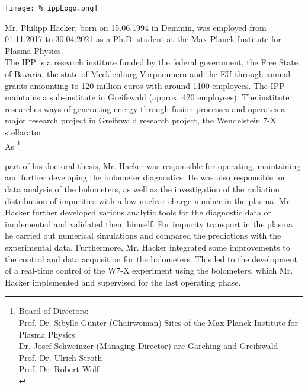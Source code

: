 \documentclass[
  fontsize=11pt,
  paper=a4,
  parskip=half,
  enlargefirstpage=on,    %
  fromalign=right,        %
  fromphone=on,           %
  fromemail=on,            
  fromrule=off,           %
  addrfield=off,          %
  backaddress=off,        %
  subject=beforeopening,  %
  locfield=narrow,        %
  foldmarks=off,          %
]{scrlttr2}
\newcommand\blankFootnote[1]{%
  \begingroup
  \renewcommand\thefootnote{}\footnote{#1}%
  \addtocounter{footnote}{-1}%
  \endgroup
}
\def\light#1{{\color{light}#1}}
\begin{document}
\begin{letter}{}

  \hspace*{9.2cm}%
  \texttt{[image: \%
    ippLogo.png]}\\%

  \opening{}

  Mr. Philipp Hacker, born on 15.06.1994 in Demmin, was employed from 01.11.2017 to 30.04.2021 as a Ph.D. student at the Max Planck Institute for Plasma Physics.\\[0.4cm]%

  The IPP is a research institute funded by the federal government, the Free State of Bavaria, the state of Mecklenburg-Vorpommern and the EU through annual grants amounting to 120 million euros with around 1100 employees. The IPP maintains a sub-institute in Greifswald (approx. 420 employees). The institute researches ways of generating energy through fusion processes and operates a major research project in Greifswald research project, the Wendelstein 7-X stellarator.\\[0.4cm]%

  As\blankFootnote{%
    \light{%
      Board of Directors:\\%
      Prof. Dr. Sibylle Günter (Chairwoman)%
      \hfill Sites of the Max Planck Institute for Plasma Physics\\%
      Dr. Josef Schweinzer (Managing Director)%
      \hfill are Garching and Greifswald\\%
      Prof. Dr. Ulrich Stroth\\%
      Prof. Dr. Robert Wolf}\\%
  } part of his doctoral thesis, Mr. Hacker was responsible for operating, maintaining and further developing the bolometer diagnostics. He was also responsible for data analysis of the bolometers, as well as the investigation of the radiation distribution of impurities with a low nuclear charge number in the plasma. Mr. Hacker further developed various analytic tools for the diagnostic data or implemented and validated them himself. For impurity transport in the plasma he carried out numerical simulations and compared the predictions with the experimental data. Furthermore, Mr. Hacker integrated some improvements to the control and data acquisition for the bolometers. This led to the development of a real-time control of the W7-X experiment using the bolometers, which Mr. Hacker implemented and supervised for the last operating phase.\\[0.4cm]%


\end{letter}
\end{document}
